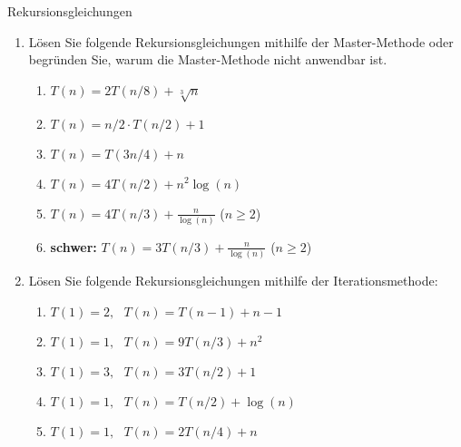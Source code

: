 \documentclass[11pt,a4paper]{article}
\begin{document}
\thispagestyle{empty}




\begin{aufgabe}{1}{Rekursionsgleichungen}
\begin{enumerate}
    \item Lösen Sie folgende Rekursionsgleichungen mithilfe der Master-Methode oder begründen Sie, warum die Master-Methode nicht anwendbar ist.
    \begin{enumerate}[label=\roman*)]
        \item $T(n) = 2T(n / 8) + \sqrt[3]{n}$
        \item $T(n) = n / 2 \cdot T(n / 2) + 1$
        \item $T(n) = T(3n / 4) + n$
        \item $T(n) = 4T(n / 2) + n^2 \log(n)$
        \item $T(n) = 4T(n / 3) + \frac{n}{\log(n)}$ ($n \geq 2$)
        \item \textbf{schwer:} $T(n) = 3T(n / 3) + \frac{n}{\log(n)}$ ($n \geq 2$)
    \end{enumerate}

    \item Lösen Sie folgende Rekursionsgleichungen mithilfe der Iterationsmethode:
    \begin{enumerate}[label=\roman*)]
        \item $T(1) = 2, \,\,\,\, T(n) = T(n - 1) + n - 1$
        \item $T(1) = 1, \,\,\,\, T(n) = 9T(n / 3) + n^2$
        \item $T(1) = 3, \,\,\,\, T(n) = 3T(n / 2) + 1$
        \item $T(1) = 1, \,\,\,\, T(n) = T(n / 2) + \log(n)$
        \item $T(1) = 1, \,\,\,\, T(n) = 2T(n / 4) + n$
    \end{enumerate}


\end{enumerate}
\end{aufgabe}
\end{document}
